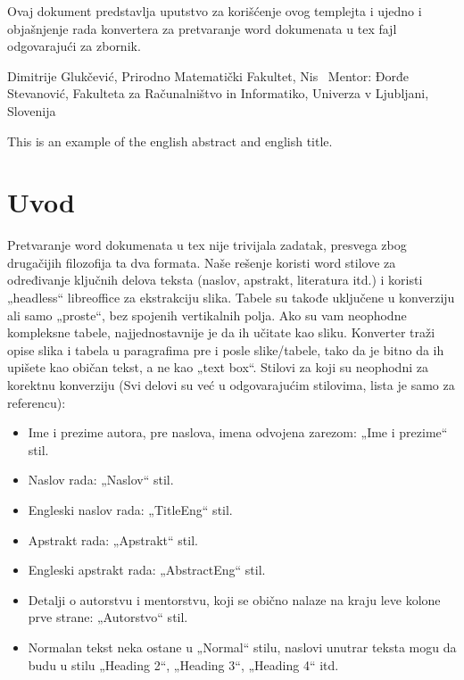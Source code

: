 
\begin{Abstract}
Ovaj dokument predstavlja uputstvo za korišćenje ovog templejta i ujedno i objašnjenje rada konvertera za pretvaranje word dokumenata u tex fajl odgovarajući za zbornik.
\end{Abstract}
\begin{AuthorEx}
Dimitrije Glukčević, Prirodno Matematički Fakultet, Nis \ Mentor: Đorđe Stevanović, Fakulteta za Računalništvo in Informatiko, Univerza v Ljubljani, Slovenija
\end{AuthorEx}
\begin{AbstractEng}
This is an example of the english abstract and english title.
\end{AbstractEng}
\StartDoublePaper
\label{doc:rad}

\AuthorExHere
\section{Uvod}
Pretvaranje word dokumenata u tex nije trivijala zadatak, presvega zbog drugačijih filozofija ta dva formata. Naše rešenje koristi word stilove za određivanje ključnih delova teksta (naslov, apstrakt, literatura itd.) i koristi „headless“ libreoffice za ekstrakciju slika. Tabele su takođe uključene u konverziju ali samo „proste“, bez spojenih vertikalnih polja. Ako su vam neophodne kompleksne tabele, najjednostavnije je da ih učitate kao sliku. Konverter traži opise slika i tabela u paragrafima pre i posle slike/tabele, tako da je bitno da ih upišete kao običan tekst, a ne kao „text box“.
Stilovi za koji su neophodni za korektnu konverziju (Svi delovi su već u odgovarajućim stilovima, lista je samo za referencu):
\begin{itemize}
\item Ime i prezime autora, pre naslova, imena odvojena zarezom: „Ime i prezime“ stil.
\item Naslov rada: „Naslov“ stil.
\item Engleski naslov rada: „TitleEng“ stil.
\item Apstrakt rada: „Apstrakt“ stil.
\item Engleski apstrakt rada: „AbstractEng“ stil.
\item Detalji o autorstvu i mentorstvu, koji se obično nalaze na kraju leve kolone prve strane: „Autorstvo“ stil.
\item Normalan tekst neka ostane u „Normal“ stilu, naslovi unutrar teksta mogu da budu u stilu „Heading 2“, „Heading 3“, „Heading 4“ itd.
\end{itemize}
